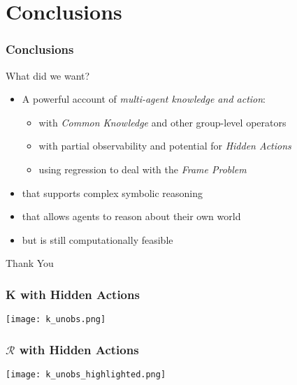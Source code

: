 \documentclass{beamer}
\begin{document}
\section{Conclusions}

\begin{frame}
\frametitle{Conclusions}
What did we want?
\begin{itemize}
\item A powerful account of \emph{multi-agent knowledge and action}:
  \begin{itemize}
    \item with \emph{Common Knowledge} and other group-level operators
    \item with partial observability and potential for \emph{Hidden Actions}
    \item using regression to deal with the \emph{Frame Problem}
  \end{itemize}
\item that supports complex symbolic reasoning
\item that allows agents to reason about their own world
\item but is still computationally feasible
\end{itemize}
\end{frame}

\begin{frame}
\centering \large Thank You\\
\end{frame}

\begin{frame}
\frametitle{K with Hidden Actions}
\begin{center}
  \texttt{[image: k\_unobs.png]}
\end{center}
\end{frame}

\begin{frame}
\frametitle{$\mathcal{R}$ with Hidden Actions}
\begin{center}
  \texttt{[image: k\_unobs\_highlighted.png]}
\end{center}
\end{frame}
\end{document}
